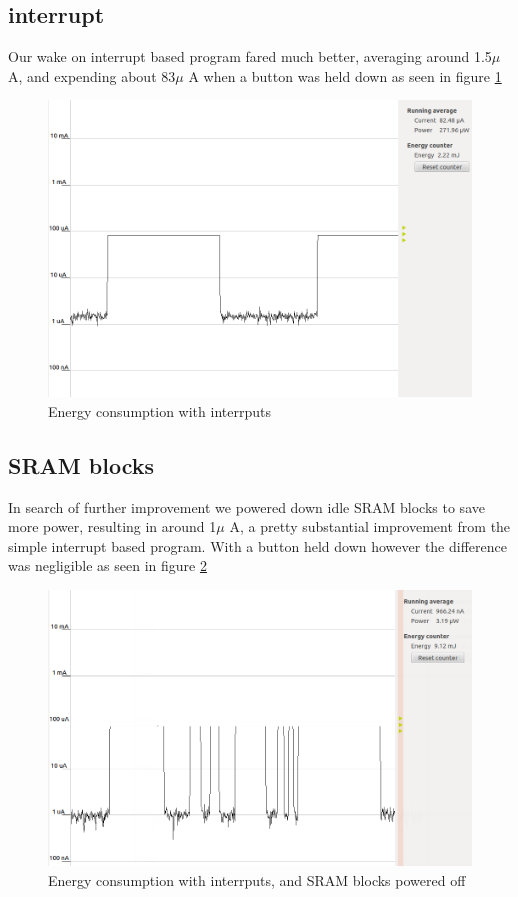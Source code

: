 \subsection{interrupt}
Our wake on interrupt based program fared much better, averaging around 1.5$\mu$ A, and expending about 83$\mu$ A when a button was held down as seen in figure \ref{fig:PerformanceInterrupts}

\begin{figure}[ht]
 \centering
 \includegraphics[width=\textwidth]{images/performance_with_interrputs.png}
 \caption{Energy consumption with interrputs}
 \label{fig:PerformanceInterrupts}
\end{figure}

\subsection{SRAM blocks}
In search of further improvement we powered down idle SRAM blocks to save more power, resulting in around 1$\mu$ A, a pretty substantial improvement from the simple interrupt based program. With a button held down however the difference was negligible as seen in figure \ref{fig:PerformanceSRAM}

\begin{figure}[ht]
 \centering
 \includegraphics[width=\textwidth]{images/performance_interrupts_sram_idle.png}
 \caption{Energy consumption with interrputs, and SRAM blocks powered off}
 \label{fig:PerformanceSRAM}
\end{figure}

